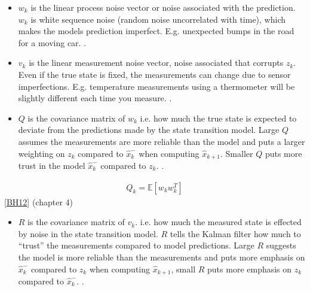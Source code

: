 \documentclass[letterpaper,10pt,english]{jupyterBook}
\begin{document}
\begin{itemize}
\item {} 
\sphinxAtStartPar
\(w_k\) is the linear process noise vector or noise associated with the prediction. \(w_k\) is white sequence noise (random noise uncorrelated with time), which makes the models prediction imperfect. E.g. unexpected bumps in the road for a moving car. .

\item {} 
\sphinxAtStartPar
\(v_k\) is the linear measurement noise vector, noise associated that corrupts \(z_k\). Even if the true state is fixed, the measurements can change due to sensor imperfections. E.g. temperature measurements using a thermometer will be slightly different each time you measure. .

\item {} 
\sphinxAtStartPar
\(Q\) is the covariance matrix of \(w_k\) i.e. how much the true state is expected to deviate from the predictions made by the state transition model. Large \(Q\) assumes the measurements are more reliable than the model and puts a larger weighting on \(z_k\) compared to \(\hat{x}^-_k\) when computing \(\hat{x}_{k+1}\). Smaller \(Q\) puts more trust in the model \(\hat{x}^-_k\) compared to \(z_k\). .

\end{itemize}
\begin{equation}\label{equation:2KalmanFilters:eq-process-noise-cov}
\begin{split}Q_k = \mathbb{E}[w_k w_k^T]\end{split}
\end{equation}
\sphinxAtStartPar
{[}\hyperlink{cite.99Bibliography:id2}{BH12}{]} (chapter 4)
\begin{itemize}
\item {} 
\sphinxAtStartPar
\(R\) is the covariance matrix of \(v_k\). i.e. how much the measured state is effected by noise in the state transition model. \(R\) tells the Kalman filter how much to “trust” the measurements compared to model predictions.  Large \(R\) suggests the model is more reliable than the measurements and puts more emphasis on \(\hat{x}^-_k\) compared to \(z_k\) when computing \(\hat{x}_{k+1}\), small \(R\) puts more emphasis on \(z_k\) compared to \(\hat{x}^-_k\). .

\end{itemize}
\end{document}
